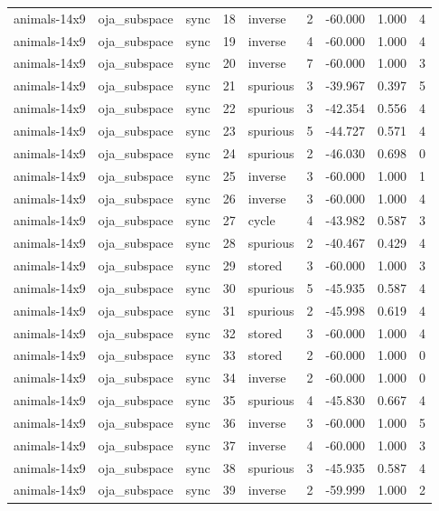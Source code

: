 \begin{tabular}{lllrlrrrr}
animals-14x9 & oja\_subspace & sync & 18 & inverse & 2 & -60.000 & 1.000 & 4 \\
animals-14x9 & oja\_subspace & sync & 19 & inverse & 4 & -60.000 & 1.000 & 4 \\
animals-14x9 & oja\_subspace & sync & 20 & inverse & 7 & -60.000 & 1.000 & 3 \\
animals-14x9 & oja\_subspace & sync & 21 & spurious & 3 & -39.967 & 0.397 & 5 \\
animals-14x9 & oja\_subspace & sync & 22 & spurious & 3 & -42.354 & 0.556 & 4 \\
animals-14x9 & oja\_subspace & sync & 23 & spurious & 5 & -44.727 & 0.571 & 4 \\
animals-14x9 & oja\_subspace & sync & 24 & spurious & 2 & -46.030 & 0.698 & 0 \\
animals-14x9 & oja\_subspace & sync & 25 & inverse & 3 & -60.000 & 1.000 & 1 \\
animals-14x9 & oja\_subspace & sync & 26 & inverse & 3 & -60.000 & 1.000 & 4 \\
animals-14x9 & oja\_subspace & sync & 27 & cycle & 4 & -43.982 & 0.587 & 3 \\
animals-14x9 & oja\_subspace & sync & 28 & spurious & 2 & -40.467 & 0.429 & 4 \\
animals-14x9 & oja\_subspace & sync & 29 & stored & 3 & -60.000 & 1.000 & 3 \\
animals-14x9 & oja\_subspace & sync & 30 & spurious & 5 & -45.935 & 0.587 & 4 \\
animals-14x9 & oja\_subspace & sync & 31 & spurious & 2 & -45.998 & 0.619 & 4 \\
animals-14x9 & oja\_subspace & sync & 32 & stored & 3 & -60.000 & 1.000 & 4 \\
animals-14x9 & oja\_subspace & sync & 33 & stored & 2 & -60.000 & 1.000 & 0 \\
animals-14x9 & oja\_subspace & sync & 34 & inverse & 2 & -60.000 & 1.000 & 0 \\
animals-14x9 & oja\_subspace & sync & 35 & spurious & 4 & -45.830 & 0.667 & 4 \\
animals-14x9 & oja\_subspace & sync & 36 & inverse & 3 & -60.000 & 1.000 & 5 \\
animals-14x9 & oja\_subspace & sync & 37 & inverse & 4 & -60.000 & 1.000 & 3 \\
animals-14x9 & oja\_subspace & sync & 38 & spurious & 3 & -45.935 & 0.587 & 4 \\
animals-14x9 & oja\_subspace & sync & 39 & inverse & 2 & -59.999 & 1.000 & 2 \\

\end{tabular}
